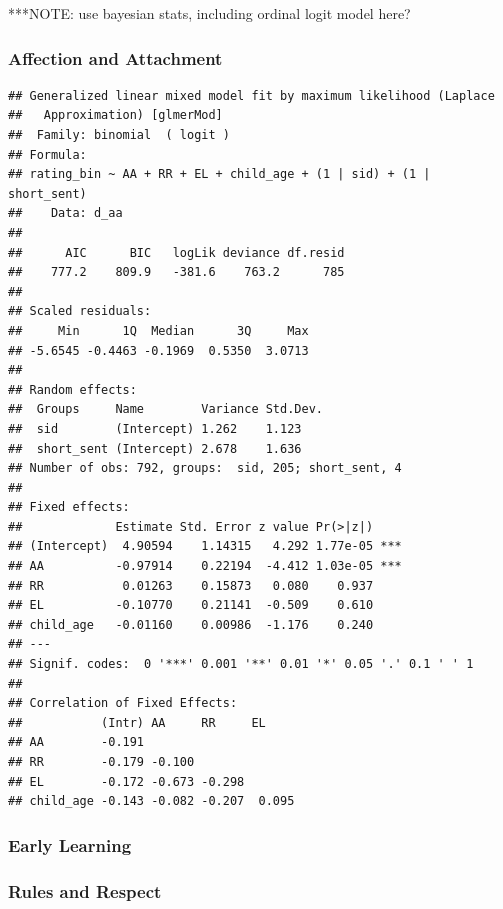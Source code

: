 \documentclass[floatsintext,man]{apa6}
\theoremstyle{definition}
\theoremstyle{definition}
\theoremstyle{definition}
\theoremstyle{remark}
\begin{document}
***NOTE: use bayesian stats, including ordinal logit model here?

\subsubsection{Affection and Attachment}\label{affection-and-attachment}

\begin{verbatim}
## Generalized linear mixed model fit by maximum likelihood (Laplace
##   Approximation) [glmerMod]
##  Family: binomial  ( logit )
## Formula: 
## rating_bin ~ AA + RR + EL + child_age + (1 | sid) + (1 | short_sent)
##    Data: d_aa
## 
##      AIC      BIC   logLik deviance df.resid 
##    777.2    809.9   -381.6    763.2      785 
## 
## Scaled residuals: 
##     Min      1Q  Median      3Q     Max 
## -5.6545 -0.4463 -0.1969  0.5350  3.0713 
## 
## Random effects:
##  Groups     Name        Variance Std.Dev.
##  sid        (Intercept) 1.262    1.123   
##  short_sent (Intercept) 2.678    1.636   
## Number of obs: 792, groups:  sid, 205; short_sent, 4
## 
## Fixed effects:
##             Estimate Std. Error z value Pr(>|z|)    
## (Intercept)  4.90594    1.14315   4.292 1.77e-05 ***
## AA          -0.97914    0.22194  -4.412 1.03e-05 ***
## RR           0.01263    0.15873   0.080    0.937    
## EL          -0.10770    0.21141  -0.509    0.610    
## child_age   -0.01160    0.00986  -1.176    0.240    
## ---
## Signif. codes:  0 '***' 0.001 '**' 0.01 '*' 0.05 '.' 0.1 ' ' 1
## 
## Correlation of Fixed Effects:
##           (Intr) AA     RR     EL    
## AA        -0.191                     
## RR        -0.179 -0.100              
## EL        -0.172 -0.673 -0.298       
## child_age -0.143 -0.082 -0.207  0.095
\end{verbatim}

\subsubsection{Early Learning}\label{early-learning}

\subsubsection{Rules and Respect}\label{rules-and-respect}
\end{document}
